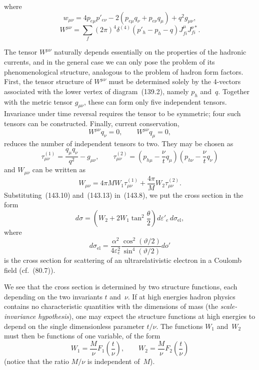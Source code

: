 where
\begin{equation}
w_{\mu\nu}=4p_{e\mu}p'_{e\nu}-2(p_{e\mu}q_\nu+p_{e\nu}q_\mu)+q^2g_{\mu\nu},
\tag{143.10}
\end{equation}
\begin{equation}
W^{\mu\nu}=\sum_f(2\pi)^4\delta^{(4)}(p'_h-p_h-q)J_{fi}^\mu J_{fi}^{\nu*}.
\tag{143.11}
\end{equation}

The tensor $W^{\mu\nu}$ naturally depends essentially on the properties of the hadronic currents, and in the general case we can only pose the problem of its phenomenological structure, analogous to the problem of hadron form factors. First, the tensor structure of $W^{\mu\nu}$ must be determined solely by the 4-vectors associated with the lower vertex of diagram~(139.2), namely $p_h$ and~$q$. Together with the metric tensor $g_{\mu\nu}$, these can form only five independent tensors. Invariance under time reversal requires the tensor to be symmetric; four such tensors can be constructed. Finally, current conservation,
\[
W^{\mu\nu}q_\nu=0,\qquad W^{\mu\nu}q_\mu=0,
\]
reduces the number of independent tensors to two. They may be chosen as
\begin{equation}
\tau_{\mu\nu}^{(1)}=\frac{q_\mu q_\nu}{q^2}-g_{\mu\nu},\qquad
\tau_{\mu\nu}^{(2)}=\left(p_{h\mu}-\frac{\nu}{t}q_\mu\right)
\left(p_{h\nu}-\frac{\nu}{t}q_\nu\right)
\tag{143.12}
\end{equation}
and $W_{\mu\nu}$ can be written as
\begin{equation}
W_{\mu\nu}=4\pi MW_1\tau_{\mu\nu}^{(1)}
+\frac{4\pi}{M}W_2\tau_{\mu\nu}^{(2)}.
\tag{143.13}
\end{equation}
Substituting~(143.10) and~(143.13) in~(143.8), we put the cross section in the form
\begin{equation}
d\sigma=\left(W_2+2W_1\tan^2\frac{\theta}{2}\right)
d\varepsilon'_e\,d\sigma_{\mathrm{el}},
\tag{143.14}
\end{equation}
where
\[
d\sigma_{\mathrm{el}}=\frac{\alpha^2}{4\varepsilon_e^2}
\frac{\cos^2(\vartheta/2)}{\sin^4(\vartheta/2)}do'
\]
is the cross section for scattering of an ultrarelativistic electron in a Coulomb field (cf.~(80.7)).

We see that the cross section is determined by two structure functions, each depending on the two invariants $t$ and~$\nu$. If at high energies hadron physics contains no characteristic quantities with the dimensions of mass (the \emph{scale-invariance hypothesis}), one may expect the structure functions at high energies to depend on the single dimensionless parameter $t/\nu$. The functions $W_1$ and~$W_2$ must then be functions of one variable, of the form
\begin{equation}
W_1=\frac{M}{\nu}F_1\left(\frac{t}{\nu}\right),\qquad
W_2=\frac{M}{\nu}F_2\left(\frac{t}{\nu}\right)
\tag{143.15}
\end{equation}
(notice that the ratio $M/\nu$ is independent of~$M$).
